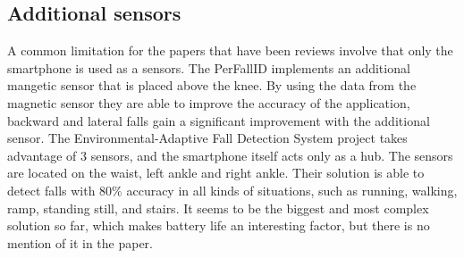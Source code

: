 \subsection{Additional sensors}
A common limitation for the papers that have been reviews involve that only the smartphone is used as a sensors. The PerFallID implements an additional mangetic sensor that is placed above the knee. By using the data from the magnetic sensor they are able to improve the accuracy of the application, backward and lateral falls gain a significant improvement with the additional sensor. The Environmental-Adaptive Fall Detection System \cite{fallDetectionWithExtraSensors} project takes advantage of 3 sensors, and the smartphone itself acts only as a hub. The sensors are located on the waist, left ankle and right ankle. Their solution is able to detect falls with 80\% accuracy in all kinds of situations, such as running, walking, ramp, standing still, and stairs. It seems to be the biggest and most complex solution so far, which makes battery life an interesting factor, but there is no mention of it in the paper.


